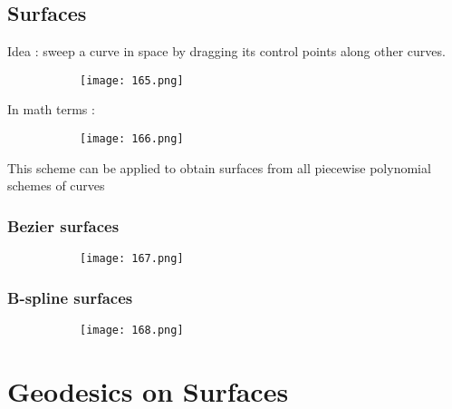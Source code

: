 \documentclass{article}
\begin{document}
\subsection{Surfaces}

Idea : sweep a curve in space by dragging its control points along other curves.

    \begin{figure}[ht!]
  \centering
  \begin{subfigure}[b]{0.8\linewidth}
    \texttt{[image: 165.png]}
  \end{subfigure}
\end{figure}

In math terms :

    \begin{figure}[ht!]
  \centering
  \begin{subfigure}[b]{0.8\linewidth}
    \texttt{[image: 166.png]}
  \end{subfigure}
\end{figure}

This scheme can be applied to obtain surfaces from all piecewise polynomial schemes of curves

\subsubsection{Bezier surfaces}

    \begin{figure}[ht!]
  \centering
  \begin{subfigure}[b]{0.8\linewidth}
    \texttt{[image: 167.png]}
  \end{subfigure}
\end{figure}

\subsubsection{B-spline surfaces}

    \begin{figure}[ht!]
  \centering
  \begin{subfigure}[b]{0.9\linewidth}
    \texttt{[image: 168.png]}
  \end{subfigure}
\end{figure}


\vspace{60mm}

\section{Geodesics on Surfaces}
\end{document}
